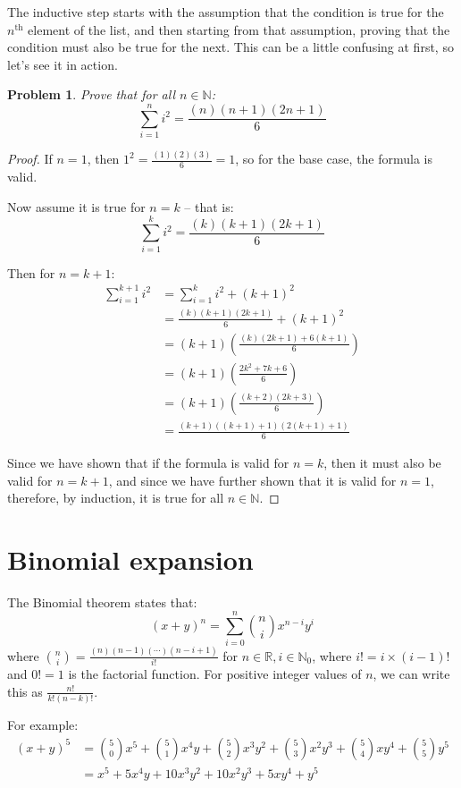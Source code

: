 \documentclass{article}
\newtheorem*{problem}{Problem}
\begin{document}
The inductive step starts with the assumption that the condition is true for the
$n^\text{th}$ element of the list, and then starting from that assumption, proving
that the condition must also be true for the next. This can be a little confusing at
first, so let's see it in action.

\begin{problem} Prove that for all $n \in \mathbb{N}$:
	\[ \sum_{i=1}^{n} i^2 = \frac{(n)(n+1)(2n+1)}{6} \]
\end{problem}

\begin{proof}
	If $n = 1$, then $1^2 = \frac{(1)(2)(3)}{6} = 1$, so for the base case, the formula is valid.

	Now assume it is true for $n=k$ -- that is:
	\[ \sum_{i=1}^{k} i^2 = \frac{(k)(k+1)(2k+1)}{6} \]

	Then for $n=k+1$:
	\begin{align*}
		\sum_{i=1}^{k+1} i^2 &= \sum_{i=1}^{k} i^2 + (k+1)^2 \\
		 &= \frac{(k)(k+1)(2k+1)}{6} + (k+1)^2 \\
		 &= \left(k+1\right)\left(\frac{(k)(2k+1) + 6(k+1)}{6}\right) \\
		 &= \left(k+1\right)\left(\frac{2k^2 +7k +6}{6}\right) \\
		 &= \left(k+1\right)\left(\frac{(k+2)(2k+3)}{6}\right) \\
		 &= \frac{(k+1)((k+1)+1)(2(k+1)+1)}{6}
	\end{align*}
	
	Since we have shown that if the formula is valid for $n=k$, then it must also
	be valid for $n=k+1$, and since we have further shown that it is valid for $n=1$,
	therefore, by induction, it is true for all $n \in \mathbb{N}$.
\end{proof}

\section{Binomial expansion}

The Binomial theorem states that:
\[ (x + y)^n = \sum_{i=0}^{n} \binom{n}{i}x^{n-i}y^{i} \]
where $\binom{n}{i} = \frac{(n)(n-1)(\cdots)(n-i+1)}{i!}$ for 
$n \in \mathbb{R}, i \in \mathbb{N}_0$, where $i! = i\times(i-1)!$ and $0!=1$ is the
factorial function. For positive integer values of $n$, we can write this as $\frac{n!}{k!(n-k)!}$.

For example:
\begin{align*}
	(x+y)^5 &= \binom{5}{0}x^5 + \binom{5}{1}x^4y + \binom{5}{2}x^3y^2 + 
	\binom{5}{3}x^2y^3 + \binom{5}{4}xy^4 + \binom{5}{5}y^5 \\
	 &= x^5 + 5x^4y + 10x^3y^2 + 10x^2y^3 + 5xy^4 + y^5
\end{align*}
\end{document}
